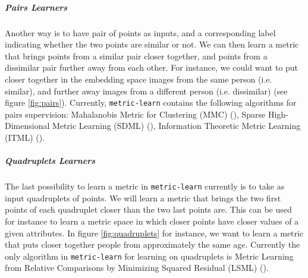\documentclass[twoside,11pt]{article}
\begin{document}
\subparagraph{Pairs Learners} 
Another way is to have pair of points as inputs, and a corresponding label indicating whether the two points are similar or not. We can then learn a metric that brings points from a similar pair closer together, and points from a dissimilar pair further away from each other. For instance, we could want to put closer together in the embedding space images from the same person (i.e. similar), and further away images from a different person (i.e. dissimilar) (see figure \ref{fig:pairs}). Currently, \texttt{metric-learn} contains the following algorithms for pairs supervision: Mahalanobis Metric for Clustering (MMC) (\cite{Xiang08}), Sparse High-Dimensional Metric Learning (SDML) (\cite{Qi09}), Information Theoretic Metric Learning (ITML) (\cite{Davis07}).
    

    

    
\subparagraph{Quadruplets Learners}
The last possibility to learn a metric in \texttt{metric-learn} currently is to take as input quadruplets of points. We will learn a metric that brings the two first points of each quadruplet closer than the two last points are. This can be used for instance to learn a metric space in which closer points have closer values of a given attributes. In figure \ref{fig:quadruplets} for instance, we want to learn a metric that puts closer together people from approximately the same age. Currently the only algorithm in \texttt{metric-learn} for learning on quadruplets is Metric Learning from Relative Comparisons by Minimizing Squared Residual (LSML) (\cite{Liu12}).
\end{document}
